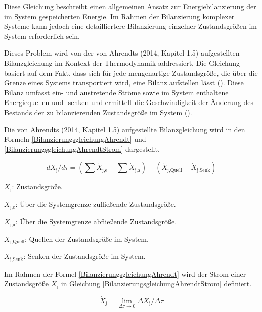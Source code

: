 Diese Gleichung beschreibt einen allgemeinen Ansatz zur Energiebilanzierung der im System gespeicherten Energie. 
Im Rahmen der Bilanzierung komplexer Systeme kann jedoch eine detailliertere Bilanzierung einzelner Zustandsgrößen im System erforderlich sein.

Dieses Problem wird von der von Ahrendts (2014, Kapitel 1.5) aufgestellten Bilanzgleichung im Kontext der Thermodynamik addressiert. 
Die Gleichung basiert auf dem Fakt, dass sich für jede mengenartige Zustandsgröße, die über die Grenze eines Systems transportiert wird, eine 
Bilanz aufstellen lässt (\cite[Kapitel 1.5]{Ahrendts.2014}). 
Diese Bilanz umfasst ein- und austretende Ströme sowie im System enthaltene Energiequellen und -senken und ermittelt die 
Geschwindigkeit der Änderung des Bestands der zu bilanzierenden Zustandsgröße im System (\cite[Kapitel 1.5]{Ahrendts.2014}).

Die von Ahrendts (2014, Kapitel 1.5) aufgestellte Bilanzgleichung wird in den Formeln \eqref{BilanzierungsgleichungAhrendt} und 
\eqref{BilanzierungsgleichungAhrendtStrom} dargestellt.

\begin{equation}
    dX_{\text{j}}/d\tau = (\sum \dot{X}_{\text{j,e}} - \sum \dot{X}_{\text{j,a}}) + (\dot{X}_{\text{j,Quell}} - \dot{X}_{\text{j,Senk}})
    \label{BilanzierungsgleichungAhrendt}
\end{equation}

\begin{description}
    \item \(X_{\text{j}}\): Zustandsgröße.
    \item \(X_{\text{j,e}}\): Über die Systemgrenze zufließende Zustandsgröße.
    \item \(X_{\text{j,a}}\): Über die Systemgrenze abfließende Zustandsgröße.
    \item \(X_{\text{j,Quell}}\): Quellen der Zustandsgröße im System.
    \item \(X_{\text{j,Senk}}\): Senken der Zustandsgröße im System.
\end{description}

Im Rahmen der Formel \eqref{BilanzierungsgleichungAhrendt} wird der Strom einer Zustandsgröße \(X_{\text{j}}\) in Gleichung 
\eqref{BilanzierungsgleichungAhrendtStrom} definiert.

\begin{equation}
    \dot{X}_{\text{j}} = \lim_{\Delta\tau \to 0} \Delta X_{\text{j}}/ \Delta\tau
    \label{BilanzierungsgleichungAhrendtStrom}
\end{equation}

